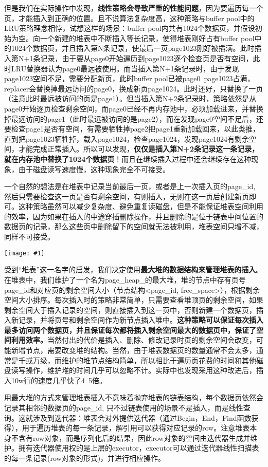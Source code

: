 \documentclass[12pt, a4paper]{article}
\def\b#1{\textbf{#1}}
\def\p{\par}
\def\g#1{\begin{center}\texttt{[image: \#1]}\end{center}}
\begin{document}
\p 但是我们在实际操作中发现，\b{线性策略会导致严重的性能问题}，因为要遍历每一个页，才能插入到正确的位置。且不说算法复杂度高，这种策略与buffer pool中的LRU策略理念相悖，试想这样的场景：buffer pool内共有1024个数据页，并假设初始为空。向一个新建的堆表中不断插入等长记录，使得堆表刚好占有buffer pool中的1024个数据页，并且插入第N条记录，使最后一页page1023刚好被插满。此时插入第N+1条记录，由于要从page0开始遍历到page1023逐个检查页是否有空间，此时LRU替换器认为page0最远被使用。而当插入第N+1条记录时，由于发现page1023空间不足，需要分配新页，此时buffer pool已被page0~page1023占满，replacer会替换掉最远访问的page0，换成新页page1024。此时还好，只替换了一页（注意此时最远被访问的页是page1）。但当插入第N+2条记录时，策略依然是从page0开始逐页检查剩余空间，而page0已经不再内存池中，必须加载进来，并替换掉最远访问的page1（此时最远被访问的是page2），而在发现page0空间不足后，还要检查page1是否有空间，有需要牺牲掉page2把page1重新加载回来，以此类推，直到把page1023牺牲掉，载入page1024，检查page1024，发现page1024有剩余空间，才能完成正常插入。所以可以发现，\b{仅仅是插入第N+2条记录这一条记录，就在内存池中替换了1024个数据页}！而且在继续插入过程中还会继续存在这种现象，由于磁盘读写速度慢，这种现象完全不可接受。
\p 一个自然的想法是在堆表中记录当前最后一页，或者是上一次插入页的page\_id, 然后只需要检查这一页是否有剩余空间，有则插入，无则在这一页后创建新页即可。这种策略虽然可以减少复杂度、避免重复读磁盘，但是不能保证堆表空间利用的效率，因为如果在插入的中途穿插删除操作，并且删除的是位于链表中间位置的数据页的记录，那么这些页中删除留下的空间就无法被利用，堆表空间只增不减，同样不可接受。
\g{imgs/record_5.png}
受到“堆表”这一名字的启发，我们决定使用\b{最大堆的数据结构来管理堆表的插入}。在堆表中，我们维护了一个名为page\_heap\_的最大堆，堆的节点中存有页号page\_id和对应页的剩余空间大小（节点结构<page\_id, free\_space>），根据剩余空间大小排序。每次插入时的策略非常简单，只需要查看堆顶页的剩余空间，如果剩余空间大于插入记录的空间，则直接插入到这一页中，否则新建一个数据页，插入新记录，并将页号和剩余空间作为新节点插入堆中。\b{这种策略可以保证每次插入最多访问两个数据页，并且保证每次都将插入剩余空间最大的数据页中，保证了空间利用效率。}当然付出的代价是插入、删除、修改记录时页的剩余空间会改变，可能新增节点，需要改变堆的结构。当然，由于堆表数据页的数量通常不会太多，通常是千或万级，而维护的堆节点结构简单，所以相比于遍历页花费的时间和其他磁盘读写操作，维护堆的时间几乎可以忽略不计。实际中也发现采用这种改进后，插入10w行的速度几乎快了4~5倍。
\p 用最大堆的方式来管理堆表插入不意味着抛弃堆表的链表结构，每个数据页依然会记录其相邻的数据页的page\_id, 只不过链表使用的场景不是插入，而是线性查询。这就涉及到迭代器：堆表会对外提供迭代器（通过Begin，End，Find函数获得），用于遍历堆表的每一条记录，解引用可以获得对应记录的row。注意堆表本身不含有row对象，而是序列化后的结果，因此row对象的空间由迭代器生成并维护。拥有迭代器使用权的是上层的executor，executor可以通过迭代器线性扫描表的每一条记录(row对象的形式)，并进行相应操作。
\end{document}
